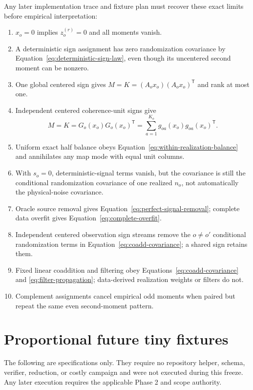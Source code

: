 \documentclass[11pt]{article}
\begin{document}
Any later implementation trace and fixture plan must recover these exact
limits before empirical interpretation:
\begin{enumerate}
\item $x_o=0$ implies $z_o^{(r)}=0$ and all moments vanish.
\item A deterministic sign assignment has zero randomization covariance by
Equation~\eqref{eq:deterministic-sign-law}, even though its uncentered second
moment can be nonzero.
\item One global centered sign gives
$M=K=(A_ox_o)(A_ox_o)^{\mathsf T}$ and rank at most one.
\item Independent centered coherence-unit signs give
\begin{equation}
  M=K=G_o(x_o)G_o(x_o)^{\mathsf T}
  =\sum_{a=1}^{K_o}g_{oa}(x_o)g_{oa}(x_o)^{\mathsf T}.
  \label{eq:independent-unit-limit}
\end{equation}
\item Uniform exact half balance obeys
Equation~\eqref{eq:within-realization-balance} and annihilates any map mode
with equal unit columns.
\item With $s_o=0$, deterministic-signal terms vanish, but the covariance is
still the conditional randomization covariance of one realized $n_o$, not
automatically the physical-noise covariance.
\item Oracle source removal gives Equation~\eqref{eq:perfect-signal-removal};
complete data overfit gives Equation~\eqref{eq:complete-overfit}.
\item Independent centered observation sign streams remove the $o\ne o'$
conditional randomization terms in Equation~\eqref{eq:coadd-covariance}; a
shared sign retains them.
\item Fixed linear coaddition and filtering obey
Equations~\eqref{eq:coadd-covariance} and
\eqref{eq:filter-propagation}; data-derived realization weights or filters do
not.
\item Complement assignments cancel empirical odd moments when paired but
repeat the same even second-moment pattern.
\end{enumerate}

\section{Proportional future tiny fixtures}

The following are specifications only.  They require no repository helper,
schema, verifier, reduction, or costly campaign and were not executed during
this freeze.  Any later execution requires the applicable Phase 2 and scope
authority.
\end{document}
